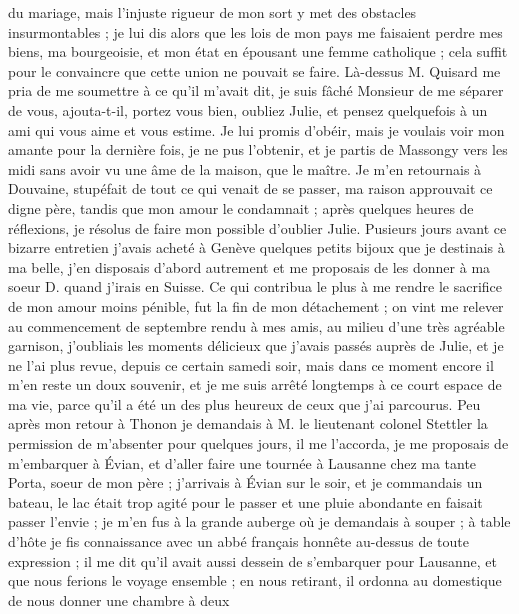 \documentclass[12pt]{article}
\begin{document}
 du mariage, mais l’injuste rigueur de mon sort y met des
obstacles insurmontables ; je lui dis alors que les lois de mon pays me faisaient perdre mes biens,
ma bourgeoisie, et mon état en épousant une femme catholique ; cela suffit pour le convaincre que
cette union ne pouvait se faire. Là-dessus M. Quisard me pria de me soumettre à ce qu’il m’avait
dit, je suis fâché Monsieur de me séparer de vous, ajouta-t-il, portez vous bien, oubliez Julie, et
pensez quelquefois à un ami qui vous aime et vous estime. Je lui promis d’obéir, mais je voulais
voir mon amante pour la dernière fois, je ne pus l’obtenir, et je partis de Massongy vers les midi
sans avoir vu une âme de la maison, que le maître. Je m’en retournais à Douvaine, stupéfait de tout
ce qui venait de se passer, ma raison approuvait ce digne père, tandis que mon amour le condamnait ;
après quelques heures de réflexions, je résolus de faire mon possible d’oublier Julie. Pusieurs
jours avant ce bizarre entretien j’avais acheté à Genève quelques petits bijoux que je destinais à
ma belle, j’en disposais d’abord autrement et me proposais de les donner à ma soeur D. quand j’irais
en Suisse. Ce qui contribua le plus à me rendre le sacrifice de mon amour moins pénible, fut la fin
de mon détachement ; on vint me relever au commencement de septembre rendu à mes amis, au milieu
d’une très agréable garnison, j’oubliais les moments délicieux que j’avais passés auprès de Julie,
et je ne l’ai plus revue, depuis ce certain samedi soir, mais dans ce moment encore il m’en reste un
doux souvenir, et je me suis arrêté longtemps à ce court espace de ma vie, parce qu’il a été un des
plus heureux de ceux que j’ai parcourus. Peu après mon retour à Thonon je demandais à M. le
lieutenant colonel Stettler la permission de m’absenter pour quelques jours, il me l’accorda, je me
proposais de m’embarquer à Évian, et d’aller faire une tournée à Lausanne chez ma tante Porta, soeur
de mon père ; j’arrivais à Évian sur le soir, et je commandais un bateau, le lac était trop agité
pour le passer et une pluie abondante en faisait passer l’envie ; je m’en fus à la grande auberge où
je demandais à souper ; à table d’hôte je fis connaissance avec un abbé français honnête au-dessus
de toute expression ; il me dit qu’il avait aussi dessein de s’embarquer pour Lausanne, et que nous
ferions le voyage ensemble ; en nous retirant, il ordonna au domestique de nous donner une chambre à
deux
\end{document}
